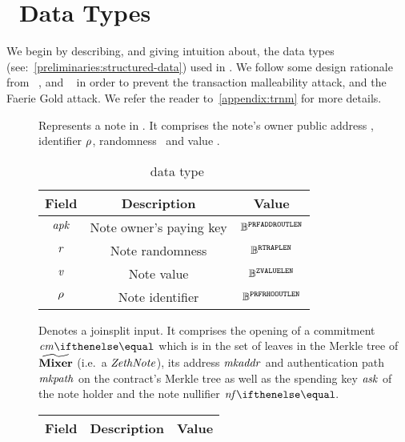 
\section{\zeth~Data Types}\label{zeth-protocol:zeth-data-types}

We begin by describing, and giving intuition about, the data types (see:~\cref{preliminaries:structured-data}) used in \zeth.
We follow some design rationale from \zerocash~\cite{sasson2014zerocash}, and \zcash~\cite{zcashprotocol} in order to prevent the transaction malleability attack, and the Faerie Gold attack\cite[Section 8.4]{zcashprotocol}. We refer the reader to~\cref{appendix:trnm} for more details.

\begin{description}
    \item[\zethNoteDType] Represents a note in \zeth. It comprises the note's owner public address \apk, identifier $\mathit{\rho}$, randomness \noter{}~and value \notev.
        \begin{table}[H]
        \centering
        \begin{tabular}{ccc}
            Field & Description & Value\\ \toprule
            $\mathit{apk}$ & Note owner's paying key & $\mathbb{B}^{\mathtt{PRFADDROUTLEN}}$\\ \midrule
            $\mathit{r}$ & Note randomness & $\mathbb{B}^{\mathtt{RTRAPLEN}}$\\ \midrule
            $\mathit{v}$ & Note value & $\mathbb{B}^{\mathtt{ZVALUELEN}}$ \\ \midrule
            $\mathit{\rho}$ & Note identifier & $\mathbb{B}^{\mathtt{PRFRHOOUTLEN}}$\\ \bottomrule
        \end{tabular}
        \caption{\zethNoteDType~data type}\label{zeth-protocol:tab:zethnote}
        \end{table}
    \item[\jsInputDType] Denotes a \gls{joinsplit} input. It comprises the opening of a commitment $\cm{}$ which is in the set of leaves in the Merkle tree of $\widetilde{\mathbf{Mixer}}$ (i.e.~a $\mathit{ZethNote}$), its address $\mathit{mkaddr}$ and authentication path $\mathit{mkpath}$ on the contract's Merkle tree as well as the spending key $\mathit{ask}$ of the note holder and the note nullifier $\nf{}$.
        \begin{table}[H]
        \centering
        \begin{tabular}{cp{20em}c}
            Field & Description & Value\\ \toprule

\end{tabular}
\end{table}
\end{description}
